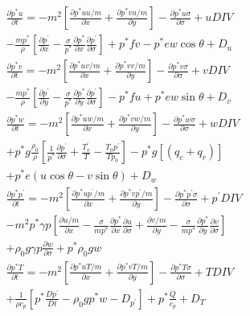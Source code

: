 \begin{gather}
\label{non-hydro-eq-first}
\frac{\partial{p^{\ast} u}}{\partial{t}} = -m^2 \left[ 
  \frac{\partial{p^{\ast} uu/m}}{\partial{x}} + 
\frac{\partial{p^{\ast} vu/m}}{\partial{y}}\right] -
  \frac{\partial{p^{\ast} u \dot{\sigma}}}{\partial{\sigma}} + 
  uDIV \\ \nonumber
  -\frac{mp^{\ast}}{\rho} \left[
    \frac{\partial{p^\prime}}{\partial{x}} -
    \frac{\sigma}{p^{\ast}}
    \frac{\partial{p^{\ast}}}{\partial{x}}
          \frac{\partial{p^\prime}}{\partial{\sigma}}\right] +
  p^{\ast}fv - p^{\ast} ew \cos\theta + D_u  \\
\frac{\partial{p^{\ast} v}}{\partial{t}}= -m^2 \left[ 
  \frac{\partial{p^{\ast} uv/m}}{\partial{x}} + 
  \frac{\partial{p^{\ast} vv/m}}{\partial{y}}\right] -
  \frac{\partial{p^{\ast} v \dot{\sigma}}}{\partial{\sigma}}+ 
  vDIV \\ \nonumber
  -\frac{mp^{\ast}}{\rho} \left[
    \frac{\partial{p^\prime}}{\partial{y}} -
    \frac{\sigma}{p^{\ast}}
    \frac{\partial{p^{\ast}}}{\partial{y}}
    \frac{\partial{p^\prime}}{\partial{\sigma}} \right] -
  p^{\ast}fu + p^{\ast} ew \sin\theta + D_v \\
\frac{\partial{p^{\ast} w}}{\partial{t}} = -m^2 \left[ 
  \frac{\partial{p^{\ast} uw/m}}{\partial{x}} + 
  \frac{\partial{p^{\ast} vw/m}}{\partial{y}}\right] -
  \frac{\partial{p^{\ast} w \dot{\sigma}}}{\partial{\sigma}} + 
  wDIV \\ \nonumber
  + p^{\ast}g\frac{\rho_0}\rho{}\left[
    \frac{1}{p^{\ast}}
    \frac{\partial{p^\prime}}{\partial{\sigma}} +
    \frac{T^{\prime}_{v}}{T} -
    \frac{T_0 p^\prime}{Tp_0} \right]
  -p^{\ast} g \left[\left(q_c+q_r\right)\right] \\ \nonumber
  + p^{\ast} e \left( u\cos\theta - v\sin\theta \right) + D_w \\
\frac{\partial{p^{\ast} p^\prime}}{\partial{t}} = -m^2 \left[ 
  \frac{\partial{p^{\ast} up^\prime/m}}{\partial{x}} + 
  \frac{\partial{p^{\ast} vp^\prime/m}}{\partial{y}}\right] -
  \frac{\partial{p^{\ast} p^\prime \dot{\sigma}}}{\partial{\sigma}} + 
  p^{\prime}DIV \\ \nonumber
  - m^2 p^{\ast} \gamma p \left[
    \frac{\partial{u/m}}{\partial{x}} -
    \frac{\sigma}{mp^{\ast}}
    \frac{\partial{p^{\ast}}}{\partial{x}}
    \frac{\partial{u}}{\partial{\sigma}} + 
    \frac{\partial{v/m}}{\partial{y}} -
    \frac{\sigma}{mp^{\ast}}
    \frac{\partial{p^{\ast}}}{\partial{y}}
    \frac{\partial{v}}{\partial{\sigma}} \right] \\ \nonumber
  + \rho_0 g \gamma p \frac{\partial{w}}{\partial{\sigma}} +
  p^{\ast} \rho_0 gw \\
\label{non-hydro-eq-last}
\frac{\partial{p^{\ast} T}}{\partial{t}} = -m^2 \left[
  \frac{\partial{p^{\ast} uT/m}}{\partial{x}} +
  \frac{\partial{p^{\ast} vT/m}}{\partial{y}} \right] -
  \frac{\partial{p^{\ast} T \dot{\sigma}}}{\partial{\sigma}} +
  TDIV \\ \nonumber
  +\frac{1}{\rho c_p}\left[p^{\ast}\frac{Dp^{\prime}}{Dt} -
  \rho_0gp^{\ast}w -D_{p^\prime}\right] +
  p^{\ast}\frac{\dot{Q}}{c_p} +D_T
\end{gather}

